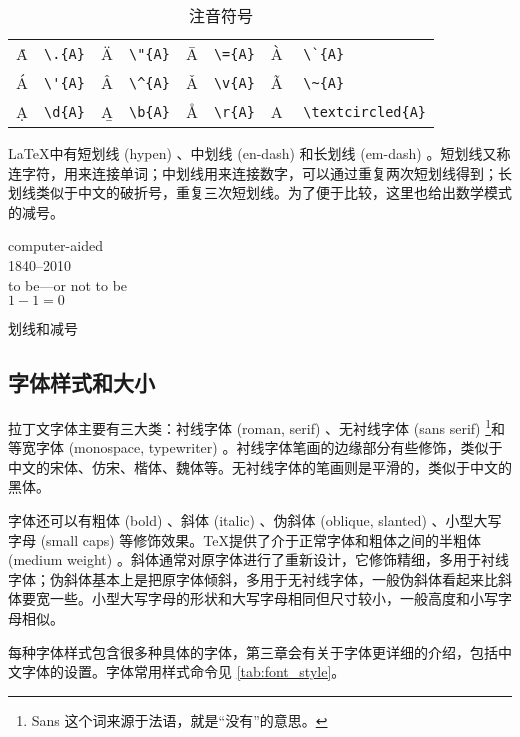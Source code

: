 \begin{table}[htbp]
\centering
\caption{注音符号}
\label{tab:accent}
\lmr
\begin{tabular}{lp{40pt}lp{40pt}lp{40pt}lp{85pt}}
  \toprule
  \.{A} & \verb|\.{A}| & \"{A} & \verb|\"{A}| & 
    \={A} & \verb|\={A}| & \`{A} & \verb|\`{A}| \\
  \'{A} & \verb|\'{A}| & \^{A} & \verb|\^{A}| & 
    \v{A} & \verb|\v{A}| & \~{A} & \verb|\~{A}| \\
  \d{A} & \verb|\d{A}| & \b{A} & \verb|\b{A}| & 
    \r{A} & \verb|\r{A}| & \textcircled{A} & \verb|\textcircled{A}| \\
  \bottomrule
\end{tabular}
\rmfamily
\end{table}

\LaTeX 中有短划线 (hypen) 、中划线 (en-dash) 和长划线 (em-dash) 。短划线又称连字符，用来连接单词；中划线用来连接数字，可以通过重复两次短划线得到；长划线类似于中文的破折号，重复三次短划线。为了便于比较，这里也给出数学模式的减号。

\begin{example}[!h]
\begin{RLDemo}[]
computer-aided\\
1840--2010\\
to be---or not to be\\
$1-1=0$
\end{RLDemo}
\caption{划线和减号}
\label{exa:dash}
\end{example}

\subsection{字体样式和大小}
\label{sec:font_style}

拉丁文字体主要有三大类：衬线字体 (roman, serif) 、无衬线字体 (sans serif) \footnote{Sans 这个词来源于法语，就是“没有”的意思。}和等宽字体 (monospace, typewriter) 。衬线字体笔画的边缘部分有些修饰，类似于中文的宋体、仿宋、楷体、魏体等。无衬线字体的笔画则是平滑的，类似于中文的黑体。

字体还可以有粗体 (bold) 、斜体 (italic) 、伪斜体 (oblique, slanted) 、小型大写字母 (small caps) 等修饰效果。\TeX 提供了介于正常字体和粗体之间的半粗体 (medium weight) 。斜体通常对原字体进行了重新设计，它修饰精细，多用于衬线字体；伪斜体基本上是把原字体倾斜，多用于无衬线字体，一般伪斜体看起来比斜体要宽一些。小型大写字母的形状和大写字母相同但尺寸较小，一般高度和小写字母相似。

每种字体样式包含很多种具体的字体，第三章会有关于字体更详细的介绍，包括中文字体的设置。字体常用样式命令见 \autoref{tab:font_style}。

